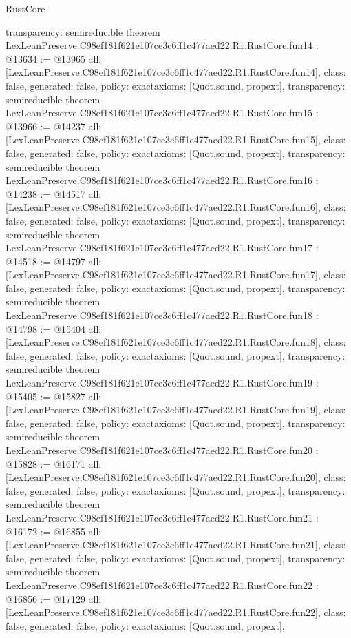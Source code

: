 \begin{lexlean}{RustCore}
\begin{coremodule}
{  transparency: semireducible
}
theorem LexLeanPreserve.C98ef181f621e107ce3c6ff1c477aed22.R1.RustCore.fun14 : @13634 := @13965 {
  all: [LexLeanPreserve.C98ef181f621e107ce3c6ff1c477aed22.R1.RustCore.fun14],
  class: false,
  generated: false,
  policy: exact{axioms: [Quot.sound, propext]},
  transparency: semireducible
}
theorem LexLeanPreserve.C98ef181f621e107ce3c6ff1c477aed22.R1.RustCore.fun15 : @13966 := @14237 {
  all: [LexLeanPreserve.C98ef181f621e107ce3c6ff1c477aed22.R1.RustCore.fun15],
  class: false,
  generated: false,
  policy: exact{axioms: [Quot.sound, propext]},
  transparency: semireducible
}
theorem LexLeanPreserve.C98ef181f621e107ce3c6ff1c477aed22.R1.RustCore.fun16 : @14238 := @14517 {
  all: [LexLeanPreserve.C98ef181f621e107ce3c6ff1c477aed22.R1.RustCore.fun16],
  class: false,
  generated: false,
  policy: exact{axioms: [Quot.sound, propext]},
  transparency: semireducible
}
theorem LexLeanPreserve.C98ef181f621e107ce3c6ff1c477aed22.R1.RustCore.fun17 : @14518 := @14797 {
  all: [LexLeanPreserve.C98ef181f621e107ce3c6ff1c477aed22.R1.RustCore.fun17],
  class: false,
  generated: false,
  policy: exact{axioms: [Quot.sound, propext]},
  transparency: semireducible
}
theorem LexLeanPreserve.C98ef181f621e107ce3c6ff1c477aed22.R1.RustCore.fun18 : @14798 := @15404 {
  all: [LexLeanPreserve.C98ef181f621e107ce3c6ff1c477aed22.R1.RustCore.fun18],
  class: false,
  generated: false,
  policy: exact{axioms: [Quot.sound, propext]},
  transparency: semireducible
}
theorem LexLeanPreserve.C98ef181f621e107ce3c6ff1c477aed22.R1.RustCore.fun19 : @15405 := @15827 {
  all: [LexLeanPreserve.C98ef181f621e107ce3c6ff1c477aed22.R1.RustCore.fun19],
  class: false,
  generated: false,
  policy: exact{axioms: [Quot.sound, propext]},
  transparency: semireducible
}
theorem LexLeanPreserve.C98ef181f621e107ce3c6ff1c477aed22.R1.RustCore.fun20 : @15828 := @16171 {
  all: [LexLeanPreserve.C98ef181f621e107ce3c6ff1c477aed22.R1.RustCore.fun20],
  class: false,
  generated: false,
  policy: exact{axioms: [Quot.sound, propext]},
  transparency: semireducible
}
theorem LexLeanPreserve.C98ef181f621e107ce3c6ff1c477aed22.R1.RustCore.fun21 : @16172 := @16855 {
  all: [LexLeanPreserve.C98ef181f621e107ce3c6ff1c477aed22.R1.RustCore.fun21],
  class: false,
  generated: false,
  policy: exact{axioms: [Quot.sound, propext]},
  transparency: semireducible
}
theorem LexLeanPreserve.C98ef181f621e107ce3c6ff1c477aed22.R1.RustCore.fun22 : @16856 := @17129 {
  all: [LexLeanPreserve.C98ef181f621e107ce3c6ff1c477aed22.R1.RustCore.fun22],
  class: false,
  generated: false,
  policy: exact{axioms: [Quot.sound, propext]},
}
\end{coremodule}
\end{lexlean}
